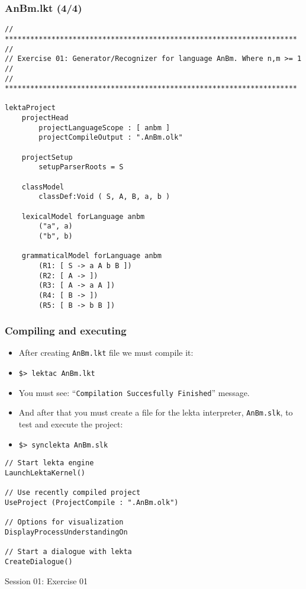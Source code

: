 \documentclass[11pt]{beamer}
\begin{document}
\begin{frame}[fragile]
\frametitle{AnBm.lkt (4/4)}
\tiny
\begin{lstlisting}[language=lekta]
// *********************************************************************
//
// Exercise 01: Generator/Recognizer for language AnBm. Where n,m >= 1
//
// *********************************************************************

lektaProject
	projectHead
		projectLanguageScope : [ anbm ]
		projectCompileOutput : ".AnBm.olk"

	projectSetup
		setupParserRoots = S

	classModel
		classDef:Void ( S, A, B, a, b )

	lexicalModel forLanguage anbm
		("a", a)
		("b", b)

	grammaticalModel forLanguage anbm
		(R1: [ S -> a A b B ])
		(R2: [ A -> ])
		(R3: [ A -> a A ])
		(R4: [ B -> ])
		(R5: [ B -> b B ])
\end{lstlisting}
\end{frame}

\begin{frame}[fragile]
\frametitle{Compiling and executing}
\begin{itemize}
	\item After creating \texttt{AnBm.lkt} file we must compile it:
	\pause
	\item \texttt{\$> lektac AnBm.lkt}
	\pause
	\item You must see: ``\texttt{Compilation Succesfully Finished}'' message.
	\pause
	\item And after that you must create a file for the lekta interpreter, \texttt{AnBm.slk}, to test and execute the project:
	\pause
	\item \texttt{\$> synclekta AnBm.slk}
\end{itemize}
\tiny
\begin{lstlisting}[language=lekta]
// Start lekta engine
LaunchLektaKernel()

// Use recently compiled project
UseProject (ProjectCompile : ".AnBm.olk")

// Options for visualization
DisplayProcessUnderstandingOn

// Start a dialogue with lekta
CreateDialogue()
\end{lstlisting}
\end{frame}

\begin{frame}[fragile]
\Huge
\begin{center}
Session 01: Exercise 01
\end{center}
\end{frame}
\end{document}
